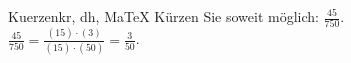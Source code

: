 \begin{MAufgabe}{Kuerzen}{kr, dh, MaTeX}
K\"urzen Sie soweit m\"oglich: $\frac{45}{750}$.\\ 
\ifLsg\MLoesung
\quad $\frac{45}{750}=\frac{(15)\cdot(3)}{(15)\cdot(50)}=\frac{3}{50}$.\else\relax\fi
 \end{MAufgabe}